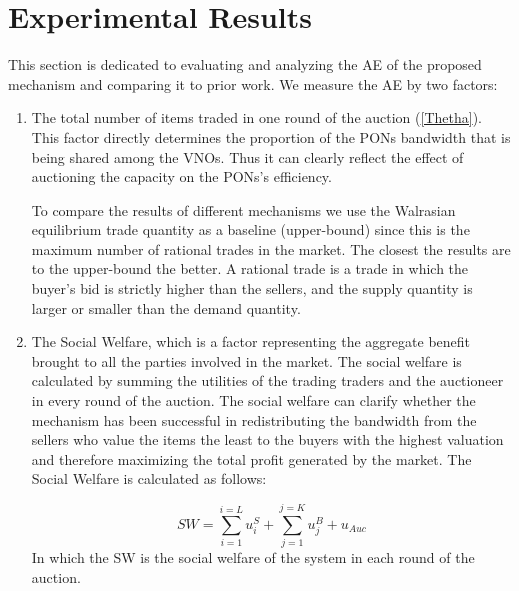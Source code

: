 

\section{Experimental Results} \label{cpt:auc:sec:results}
This section is dedicated to evaluating and analyzing the \ac{AE} of the proposed mechanism and comparing it to prior work. We measure the \ac{AE} by two factors:
\begin{enumerate}
\item The total number of items traded in one round of the auction (\autoref{Thetha}). This factor directly determines the proportion of the \acp{PON} bandwidth that is being shared among the VNOs. Thus it can clearly reflect the effect of auctioning the capacity on the \acp{PON}'s efficiency.

To compare the results of different mechanisms we use the Walrasian equilibrium trade quantity as a baseline (upper-bound) since this is the maximum number of rational trades in the market. The closest the results are to the upper-bound the better. A rational trade is a trade in which the buyer's bid is strictly higher than the sellers, and the supply quantity is larger or smaller than the demand quantity.

\item The Social Welfare, which is a factor representing the aggregate benefit brought to all the parties involved in the market. The social welfare is calculated by summing the utilities of the trading traders and the auctioneer in every round of the auction. The social welfare can clarify whether the mechanism has been successful in redistributing the bandwidth from the sellers who value the items the least to the buyers with the highest valuation and therefore maximizing the total profit generated by the market. The Social Welfare is calculated as follows:

\begin{equation}
\label{SW:formula}
SW = \sum_{i=1}^{i=L} u^S_i + \sum_{j=1}^{j=K} u^B_j + u_{Auc}
\end{equation}
In which the SW is the social welfare of the system in each round of the auction.
\end{enumerate}

